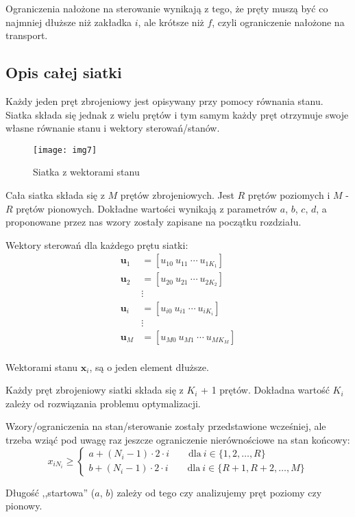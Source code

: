 \documentclass[11pt]{article}
\begin{document}
{Ograniczenia nałożone na sterowanie wynikają z tego, że pręty muszą być co najmniej dłuższe niż zakładka $i$, ale krótsze niż $f$, czyli ograniczenie nałożone na transport.

\subsection{Opis całej siatki}
Każdy jeden pręt zbrojeniowy jest opisywany przy pomocy równania stanu. Siatka składa się jednak z wielu prętów i tym samym każdy pręt otrzymuje swoje własne równanie stanu i wektory sterowań/stanów.
\begin{figure}[h!]
	\centering
	\texttt{[image: img7]}
	\caption{Siatka z wektorami stanu}
\end{figure}

Cała siatka składa się z $M$ prętów zbrojeniowych. Jest $R$ prętów poziomych i $M$ - $R$ prętów pionowych. Dokładne wartości wynikają z parametrów $a$, $b$, $c$, $d$, a proponowane przez nas wzory zostały zapisane na początku rozdziału.


Wektory sterowań dla każdego prętu siatki:
\begin{align*}
\mathbf{u}_1 &= \left[ u_{10} \ u_{11} \ \cdots \ u_{1K_1} \right] \\
\mathbf{u}_2 &= \left[ u_{20} \ u_{21} \ \cdots \ u_{2K_2} \right] \\
& \vdots \\
\mathbf{u}_i &= \left[ u_{i0} \ u_{i1} \ \cdots \ u_{iK_i} \right] \\
& \vdots \\
\mathbf{u}_M &= \left[ u_{M0} \ u_{M1} \ \cdots \ u_{MK_M} \right] \\
\end{align*}

Wektorami stanu $\mathbf{x}_i$, są o jeden element dłuższe.

Każdy pręt zbrojeniowy siatki składa się z $K_i$ + 1 prętów. Dokładna wartość $K_i$ zależy od rozwiązania problemu optymalizacji.

Wzory/ograniczenia na stan/sterowanie zostały przedstawione wcześniej, ale trzeba wziąć pod uwagę raz jeszcze ograniczenie nierównościowe na stan końcowy:
\begin{equation*}
x_{iN_i} \ge
	\begin{cases}
	a + (N_i - 1) \cdot 2 \cdot i \qquad \text{dla} \ i \in \{1, 2, \ldots, R\} \\
	b + (N_i - 1) \cdot 2 \cdot i \qquad \text{dla} \ i \in \{R+1, R+2, \ldots, M\}
	\end{cases}
\end{equation*}

Długość ,,startowa'' ($a$, $b$) zależy od tego czy analizujemy pręt poziomy czy pionowy.

\newpage
}{}
\end{document}

